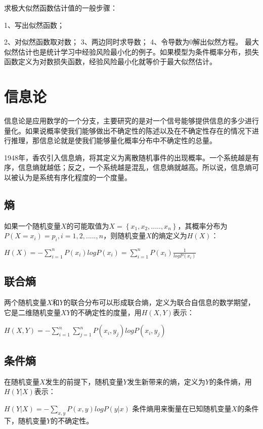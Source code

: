 \documentclass[11pt]{book}
\newcounter{#2}
\newcounter{#2}[#1]
\numberwithin{#2}{#1}
\begin{document}
求极大似然函数估计值的一般步骤：

1、写出似然函数；

2、对似然函数取对数；
3、两边同时求导数；
4、令导数为$ 0 $解出似然方程。
最大似然估计也是统计学习中经验风险最小化的例子。如果模型为条件概率分布，损失函数定义为对数损失函数，经验风险最小化就等价于最大似然估计。


\section{信息论}

信息论是应用数学的一个分支，主要研究的是对一个信号能够提供信息的多少进行量化。如果说概率使我们能够做出不确定性的陈述以及在不确定性存在的情况下进行推理，那信息论就是使我们能够量化概率分布中不确定性的总量。

1948年，香农引入信息熵，将其定义为离散随机事件的出现概率。一个系统越是有序，信息熵就越低；反之，一个系统越是混乱，信息熵就越高。所以说，信息熵可以被认为是系统有序化程度的一个度量。
\subsection{熵}

如果一个随机变量$ X $的可能取值为$ X=\left\{ x_{1},x_{2} ,.....,x_{n}   \right\}  $，其概率分布为$ P\left( X=x_{i}  \right) =p_{i} ,i=1,2,.....,n $，则随机变量$ X $的熵定义为$ H(X) $：

$ H\left( X \right) =-\sum_{i=1}^{n}{P\left( x_{i}  \right) logP\left( x_{i}  \right) } =\sum_{i=1}^{n}{P\left( x_{i}  \right) \frac{1}{logP\left( x_{i}  \right) } }  $
\subsection{联合熵}

两个随机变量$ X $和$ Y $的联合分布可以形成联合熵，定义为联合自信息的数学期望，它是二维随机变量$ XY $的不确定性的度量，用$ H(X,Y) $表示：

$ H\left( X,Y \right) =-\sum_{i=1}^{n}{\sum_{j=1}^{n}{P\left( x_{i} ,y_{j}  \right)} logP\left( x_{i},y_{j}   \right)  }  $
\subsection{条件熵}

在随机变量$ X $发生的前提下，随机变量$ Y $发生新带来的熵，定义为$ Y $的条件熵，用$ H(Y|X) $表示：

$ H\left(Y|X \right) =-\sum_{x,y}^{}{P\left( x,y \right) logP\left( y|x \right) }  $
条件熵用来衡量在已知随机变量$ X $的条件下，随机变量$ Y $的不确定性。
\end{document}
